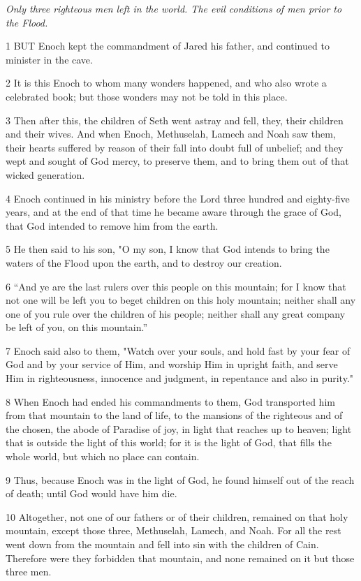 \par \textit{Only three righteous men left in the world. The evil conditions of men prior to the Flood.}

\par 1 BUT Enoch kept the commandment of Jared his father, and continued to minister in the cave.

\par 2 It is this Enoch to whom many wonders happened, and who also wrote a celebrated book; but those wonders may not be told in this place.

\par 3 Then after this, the children of Seth went astray and fell, they, their children and their wives. And when Enoch, Methuselah, Lamech and Noah saw them, their hearts suffered by reason of their fall into doubt full of unbelief; and they wept and sought of God mercy, to preserve them, and to bring them out of that wicked generation.

\par 4 Enoch continued in his ministry before the Lord three hundred and eighty-five years, and at the end of that time he became aware through the grace of God, that God intended to remove him from the earth.

\par 5 He then said to his son, "O my son, I know that God intends to bring the waters of the Flood upon the earth, and to destroy our creation.

\par 6 “And ye are the last rulers over this people on this mountain; for I know that not one will be left you to beget children on this holy mountain; neither shall any one of you rule over the children of his people; neither shall any great company be left of you, on this mountain.”

\par 7 Enoch said also to them, "Watch over your souls, and hold fast by your fear of God and by your service of Him, and worship Him in upright faith, and serve Him in righteousness, innocence and judgment, in repentance and also in purity."

\par 8 When Enoch had ended his commandments to them, God transported him from that mountain to the land of life, to the mansions of the righteous and of the chosen, the abode of Paradise of joy, in light that reaches up to heaven; light that is outside the light of this world; for it is the light of God, that fills the whole world, but which no place can contain.

\par 9 Thus, because Enoch was in the light of God, he found himself out of the reach of death; until God would have him die.

\par 10 Altogether, not one of our fathers or of their children, remained on that holy mountain, except those three, Methuselah, Lamech, and Noah. For all the rest went down from the mountain and fell into sin with the children of Cain. Therefore were they forbidden that mountain, and none remained on it but those three men.


